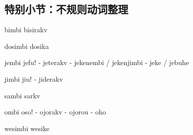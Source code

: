 \subsection{特别小节：不规则动词整理}

\begin{des}
    \item[bimbi] bisirakv 
    \item[dosimbi] dosika 
    \item[jembi] jefu! - jeterakv - jekenembi / jekenjimbi - jeke / jebuhe
    \item[jimbi] jiu! - jiderakv
    \item[sambi] sarkv 
    \item[ombi] oso! - ojorakv - ojorou - oho
    \item[wesimbi] wesike 
\end{des}

